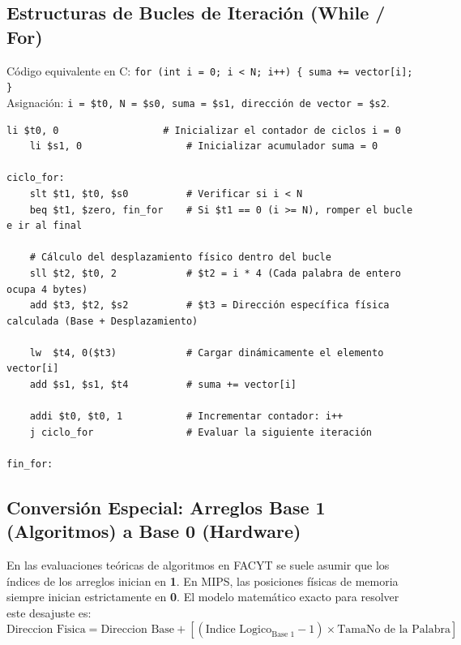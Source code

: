 \documentclass[11pt,letterpaper]{article}
\begin{document}
\subsection{Estructuras de Bucles de Iteración (While / For)}
Código equivalente en C: \texttt{for (int i = 0; i < N; i++) \{ suma += vector[i]; \}} \\
Asignación: \texttt{i = \$t0, N = \$s0, suma = \$s1, dirección de vector = \$s2}.
\begin{lstlisting}[caption={Bucle indexado estándar con cálculo dinámico de offset.}]
    li $t0, 0                  # Inicializar el contador de ciclos i = 0
    li $s1, 0                  # Inicializar acumulador suma = 0

ciclo_for:
    slt $t1, $t0, $s0          # Verificar si i < N
    beq $t1, $zero, fin_for    # Si $t1 == 0 (i >= N), romper el bucle e ir al final
    
    # Cálculo del desplazamiento físico dentro del bucle
    sll $t2, $t0, 2            # $t2 = i * 4 (Cada palabra de entero ocupa 4 bytes)
    add $t3, $t2, $s2          # $t3 = Dirección específica física calculada (Base + Desplazamiento)
    
    lw  $t4, 0($t3)            # Cargar dinámicamente el elemento vector[i]
    add $s1, $s1, $t4          # suma += vector[i]
    
    addi $t0, $t0, 1           # Incrementar contador: i++
    j ciclo_for                # Evaluar la siguiente iteración

fin_for:
\end{lstlisting}

\subsection{Conversión Especial: Arreglos Base 1 (Algoritmos) a Base 0 (Hardware)}
En las evaluaciones teóricas de algoritmos en FACYT se suele asumir que los índices de los arreglos inician en \textbf{1}. En MIPS, las posiciones físicas de memoria siempre inician estrictamente en \textbf{0}.
El modelo matemático exacto para resolver este desajuste es:
\begin{equation}
\text{Direccion Fisica} = \text{Direccion Base} + [(\text{Indice Logico}_{\text{Base 1}} - 1) \times \text{TamaNo de la Palabra}]
\end{equation}
\end{document}

